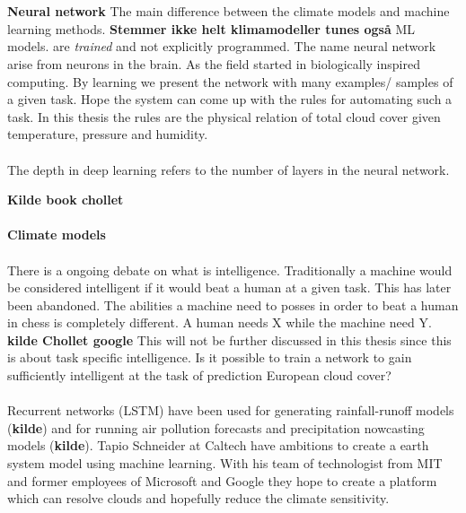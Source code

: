 \\ \\ 
\textbf{Neural network}
The main difference between the climate models and machine learning methods. \textbf{Stemmer ikke helt klimamodeller tunes også} ML models. are \textit{trained} and not explicitly programmed. The name neural network arise from neurons in the brain. As the field started in biologically
inspired computing. By learning we present the network with many examples/ samples of a given task. Hope the system can come up with the rules for automating such a task. In this thesis the rules are the physical relation of total cloud cover given temperature, pressure and humidity.
\\ \\
The depth in deep learning refers to the number of layers in the neural network.



\textbf{Kilde book chollet}
\\ \\
\textbf{Climate models}
\\ \\
There is a ongoing debate on what is intelligence. Traditionally a machine would be considered intelligent if it would beat a human at a given task. This has later been abandoned. The abilities a machine need to posses in order to beat a human in chess is completely different. A human needs X while the machine need Y. \textbf{kilde Chollet google} This will not be further discussed in this thesis since this is about task specific intelligence. Is it possible to train a network to gain sufficiently intelligent at the task of prediction European cloud cover?
\\ \\
Recurrent networks (LSTM) have been used for generating rainfall-runoff models (\textbf{kilde}) and for running air pollution forecasts and precipitation nowcasting models (\textbf{kilde}). Tapio Schneider at Caltech have ambitions to create a earth system model using machine learning. With his team of technologist from MIT and former employees of Microsoft and Google they hope to create a platform which can resolve clouds and hopefully reduce the climate sensitivity. 
\\ \\

